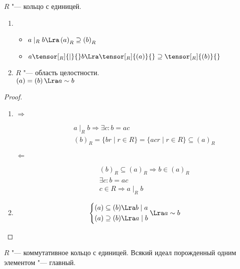 \begin{exmp}
	$R$ "--- кольцо с единицей.
	\begin{enumerate}
	\item
		\begin{itemize}
			\item $a \mid _{R} b \Lra \left(a\right)_{R} \supseteq \left(b\right)_{R}$
			\item $a \tensor[_R]{\mid}{} b \Lra \tensor[_R]{(a)}{} \supseteq \tensor[_R]{(b)}{}$
		\end{itemize}

	\item
		$R$ "--- область целостности. \\
			$\left(a\right) = \left(b\right) \Lra a \sim b$
	\end{enumerate}
	\begin{proof}
		\begin{enumerate}
			\item
			\begin{description}
				\item[$\Rightarrow$]
				\begin{gather*}
					a \mid_{R} b \Rightarrow \exists c \colon b=ac \\
					\left(b\right)_{R} = \{br \mid r \in R\} = \{acr \mid r \in R\} \subseteq \left(a\right)_{R}
				\end{gather*}
				\item[$\Leftarrow$]
				\begin{gather*}
					\left(b\right)_{R} \subseteq \left(a\right)_{R} \Rightarrow b \in \left(a\right)_{R} \\
					\exists c \colon b = ac \\
					c \in R \Rightarrow a \mid_{R} b
				\end{gather*}
			\end{description}
			\item
				\[
					\left\{\begin{aligned}
						\left(a\right) \subseteq \left(b\right) &\Lra b \mid a\\
						\left(a\right) \supseteq \left(b\right) &\Lra a \mid b
					\end{aligned}\right.
					\Lra a \sim b
				\]
		\end{enumerate}
	\end{proof}
\end{exmp}

\begin{Def}
	$R$ "--- коммутативное кольцо с единицей.
	Всякий идеал порожденный одним элементом "--- главный.
\end{Def}


